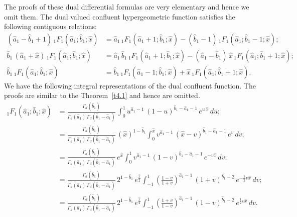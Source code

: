 \documentclass[11pt,a4paper,fleqn]{article}
\numberwithin{equation}{section}
\numberwithin{lemma}{section}
\numberwithin{theorem}{section}
\numberwithin{corollary}{section}
\begin{document}
The proofs of these dual differential formulas are very elementary and hence we omit them. The dual valued confluent hypergeometric function satisfies the following contiguous relations:
\begin{align}
	(\widehat{a}_1 - \widehat{b}_1 + 1) \, {}_1F_1(\widehat{a}_1; \widehat{b}_1; \widehat{x}) & = \widehat{a}_1 \, {}_1F_1(\widehat{a}_1 + 1; \widehat{b}_1; \widehat{x}) - (\widehat{b}_1 - 1) \, {}_1F_1(\widehat{a}_1; \widehat{b}_1 - 1; \widehat{x});
	\\[5pt]
	\widehat{b}_1 \, (\widehat{a}_1 + \widehat{x}) \, {}_1F_1(\widehat{a}_1; \widehat{b}_1; \widehat{x}) & = \widehat{a}_1 \,  \widehat{b}_1 \, {}_1F_1(\widehat{a}_1 + 1; \widehat{b}_1; \widehat{x}) - (\widehat{a}_1 - \widehat{b}_1) \, \widehat{x} \, {}_1F_1(\widehat{a}_1; \widehat{b}_1 + 1; \widehat{x});
	\\[5pt]
	\widehat{b}_1 \, {}_1F_1(\widehat{a}_1; \widehat{b}_1; \widehat{x}) &= \widehat{b}_1 \, {}_1F_1(\widehat{a}_1 - 1; \widehat{b}_1; \widehat{x}) + \widehat{x} \, {}_1F_1(\widehat{a}_1; \widehat{b}_1 + 1; \widehat{x}).
\end{align} 
We have the following integral representations of the dual confluent function. The proofs are similar to the Theorem~\ref{t4.1} and hence are omitted. 
\begin{align}
{}_1F_1 (\widehat{a}_1; \widehat{b}_1;  \widehat{x}) & =  \frac{\Gamma_d(\widehat{b}_1)}{\Gamma_d(\widehat{a}_1) \, \Gamma_d(\widehat{b}_1 - \widehat{a}_1)} \,  \int_{0}^{1} u^{\widehat{a}_1 - 1} \, (1 - u)^{\widehat{b}_1 - \widehat{a}_1 - 1} \, e^{u \, \widehat{x}} \, d u;\nonumber\\
& = \frac{\Gamma_d(\widehat{b}_1)}{\Gamma_d(\widehat{a}_1) \, \Gamma_d(\widehat{b}_1 - \widehat{a}_1)} \, (\widehat{x})^{1 - \widehat{b}_1} \int_{0}^{\widehat{x}} v^{\widehat{a}_1 - 1} \, (\widehat{x} - v)^{\widehat{b}_1 - \widehat{a}_1 - 1} \, e^{v} \, d v;\nonumber\\
& = \frac{\Gamma_d(\widehat{b}_1)}{\Gamma_d(\widehat{a}_1) \, \Gamma_d(\widehat{b}_1 - \widehat{a}_1)} \, e^{\widehat{x}} \int_{0}^{1} v^{\widehat{a}_1 - 1} \, (1 - v)^{\widehat{b}_1 - \widehat{a}_1 - 1} \, e^{- v \widehat{x}} \, d v;\nonumber\\
& = \frac{\Gamma_d(\widehat{b}_1)}{\Gamma_d(\widehat{a}_1) \, \Gamma_d(\widehat{b}_1 - \widehat{a}_1)} \, 2^{1 - \widehat{b}_1} \, e^{\frac{\widehat{x}}{2}} \int_{-1}^{1} \left(\frac{1 - v}{1 + v}\right)^{\widehat{a}_1 - 1} \, (1 + v)^{\widehat{b}_1 -  2} \, e^{- \frac{1}{2} v \widehat{x}} \, d v;\nonumber\\
& = \frac{\Gamma_d(\widehat{b}_1)}{\Gamma_d(\widehat{a}_1) \, \Gamma_d(\widehat{b}_1 - \widehat{a}_1)} \, 2^{1 - \widehat{b}_1} \, e^{\frac{\widehat{x}}{2}} \int_{-1}^{1} \left(\frac{1 + v}{1 - v}\right)^{\widehat{a}_1 - 1} \, (1 - v)^{\widehat{b}_1 -  2} \, e^{ \frac{1}{2} v \widehat{x}} \, d v.
\end{align}
\end{document}
